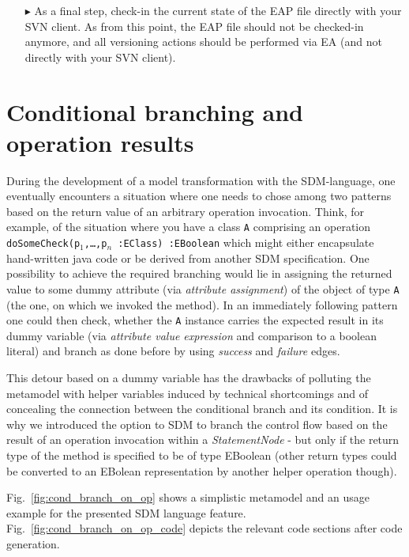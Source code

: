 \begin{enumerate}
\item[$\blacktriangleright$] As a final step, check-in the current state of the EAP file directly with your SVN client. 
As from this point, the EAP file should not be checked-in anymore, and all versioning actions should be performed via EA (and not directly with your SVN client).
\end{enumerate}

\section{Conditional branching and operation results}
During the development of a model transformation with the SDM-language, one eventually encounters a situation where one needs to chose among two patterns based on the return value of an arbitrary operation invocation.
Think, for example, of the situation where you have a class \texttt{A} comprising an operation \mbox{\texttt{doSomeCheck(p$_1$,\ldots,p$_n$ :EClass) :EBoolean}}
which might either encapsulate hand-written java code or be derived from another SDM specification. One possibility to achieve the required branching would lie in assigning the returned value to some dummy attribute (via \emph{attribute assignment}) of
the object of type \texttt{A} (the one, on which we invoked the method). In an immediately following pattern one could then check, whether the \texttt{A} instance carries the expected result in its dummy variable (via \emph{attribute value expression} and comparison to a boolean literal) and branch as done before by using \emph{success} and \emph{failure} edges.

This detour based on a dummy variable has the drawbacks of polluting the metamodel with helper variables induced by technical shortcomings and of concealing the connection between the conditional branch and its condition. It is why we introduced the option to SDM to branch the control flow based on the result of an operation invocation within a \emph{StatementNode} - but only if the return type of the method is specified to be of type EBoolean (other return types could be converted to an EBolean representation by another helper operation though).

Fig.~\ref{fig:cond_branch_on_op} shows a simplistic metamodel and an usage example for the presented SDM language feature. Fig.~\ref{fig:cond_branch_on_op_code} depicts the relevant code sections after code generation. 


